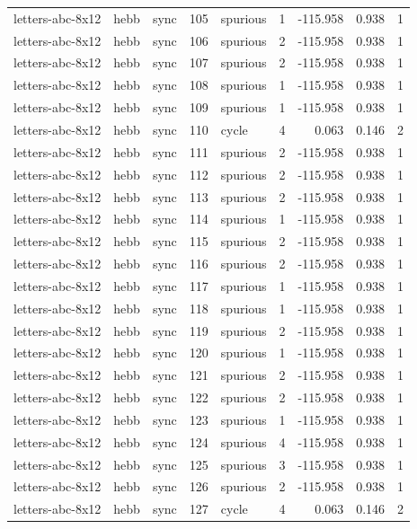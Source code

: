 \begin{tabular}{lllrlrrrr}
letters-abc-8x12 & hebb & sync & 105 & spurious & 1 & -115.958 & 0.938 & 1 \\
letters-abc-8x12 & hebb & sync & 106 & spurious & 2 & -115.958 & 0.938 & 1 \\
letters-abc-8x12 & hebb & sync & 107 & spurious & 2 & -115.958 & 0.938 & 1 \\
letters-abc-8x12 & hebb & sync & 108 & spurious & 1 & -115.958 & 0.938 & 1 \\
letters-abc-8x12 & hebb & sync & 109 & spurious & 1 & -115.958 & 0.938 & 1 \\
letters-abc-8x12 & hebb & sync & 110 & cycle & 4 & 0.063 & 0.146 & 2 \\
letters-abc-8x12 & hebb & sync & 111 & spurious & 2 & -115.958 & 0.938 & 1 \\
letters-abc-8x12 & hebb & sync & 112 & spurious & 2 & -115.958 & 0.938 & 1 \\
letters-abc-8x12 & hebb & sync & 113 & spurious & 2 & -115.958 & 0.938 & 1 \\
letters-abc-8x12 & hebb & sync & 114 & spurious & 1 & -115.958 & 0.938 & 1 \\
letters-abc-8x12 & hebb & sync & 115 & spurious & 2 & -115.958 & 0.938 & 1 \\
letters-abc-8x12 & hebb & sync & 116 & spurious & 2 & -115.958 & 0.938 & 1 \\
letters-abc-8x12 & hebb & sync & 117 & spurious & 1 & -115.958 & 0.938 & 1 \\
letters-abc-8x12 & hebb & sync & 118 & spurious & 1 & -115.958 & 0.938 & 1 \\
letters-abc-8x12 & hebb & sync & 119 & spurious & 2 & -115.958 & 0.938 & 1 \\
letters-abc-8x12 & hebb & sync & 120 & spurious & 1 & -115.958 & 0.938 & 1 \\
letters-abc-8x12 & hebb & sync & 121 & spurious & 2 & -115.958 & 0.938 & 1 \\
letters-abc-8x12 & hebb & sync & 122 & spurious & 2 & -115.958 & 0.938 & 1 \\
letters-abc-8x12 & hebb & sync & 123 & spurious & 1 & -115.958 & 0.938 & 1 \\
letters-abc-8x12 & hebb & sync & 124 & spurious & 4 & -115.958 & 0.938 & 1 \\
letters-abc-8x12 & hebb & sync & 125 & spurious & 3 & -115.958 & 0.938 & 1 \\
letters-abc-8x12 & hebb & sync & 126 & spurious & 2 & -115.958 & 0.938 & 1 \\
letters-abc-8x12 & hebb & sync & 127 & cycle & 4 & 0.063 & 0.146 & 2 \\

\end{tabular}

